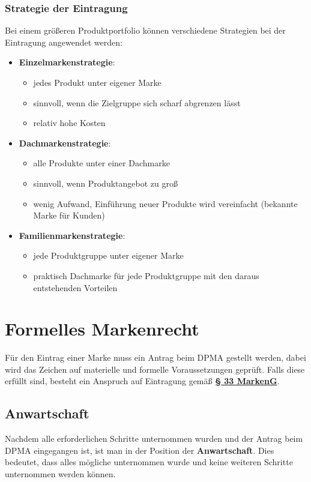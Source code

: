 \documentclass[12pt,A4]{extarticle}
\newcommand{\highlight}[1]{\textcolor{highlightColor}{\textbf{#1}}}
\newcommand{\markenG}[2][]{\textbf{\textcolor{markenGesetzLink}{\href{https://www.gesetze-im-internet.de/markeng/__#2.html}{§ #2 \ifthenelse{\equal{#1}{}}{}{#1 }MarkenG}}}}
\begin{document}
\subsubsection{Strategie der Eintragung}
Bei einem größeren Produktportfolio können verschiedene Strategien bei der Eintragung angewendet werden:
\begin{itemize}
  \item{\highlight{Einzelmarkenstrategie}:
              \begin{itemize}
                \item{jedes Produkt unter eigener Marke}
                \item{sinnvoll, wenn die Zielgruppe sich scharf abgrenzen lässt}
                \item{relativ hohe Kosten}
              \end{itemize}
        }
  \item{\highlight{Dachmarkenstrategie}:
              \begin{itemize}
                \item{alle Produkte unter einer Dachmarke}
                \item{sinnvoll, wenn Produktangebot zu groß}
                \item{wenig Aufwand, Einführung neuer Produkte wird vereinfacht (bekannte Marke für Kunden)}
              \end{itemize}
        }
  \item{\highlight{Familienmarkenstrategie}:
              \begin{itemize}
                \item{jede Produktgruppe unter eigener Marke}
                \item{praktisch Dachmarke für jede Produktgruppe mit den daraus entstehenden Vorteilen}
              \end{itemize}
        }
\end{itemize}

\section{Formelles Markenrecht}
Für den Eintrag einer Marke muss ein Antrag beim DPMA gestellt werden, dabei wird das Zeichen auf materielle und formelle Voraussetzungen geprüft. Falls diese erfüllt sind, besteht ein Anspruch auf Eintragung gemäß \markenG[Abs. 2]{33}.

\subsection{Anwartschaft}
Nachdem alle erforderlichen Schritte unternommen wurden und der Antrag beim DPMA eingegangen ist, ist man in der Position der \textbf{Anwartschaft}. Dies bedeutet, dass alles mögliche unternommen wurde und keine weiteren Schritte unternommen werden können.
\end{document}
